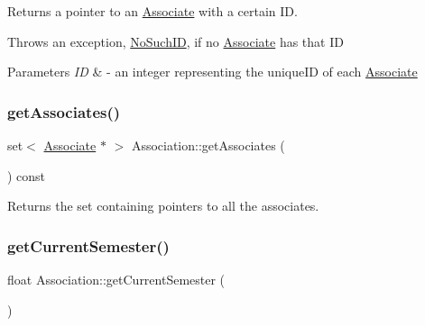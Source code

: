 Returns a pointer to an \mbox{\hyperlink{classAssociate}{Associate}} with a certain ID. 

Throws an exception, \mbox{\hyperlink{classNoSuchID}{No\+Such\+ID}}, if no \mbox{\hyperlink{classAssociate}{Associate}} has that ID


\begin{DoxyParams}{Parameters}
{\em ID} & -\/ an integer representing the unique\+ID of each \mbox{\hyperlink{classAssociate}{Associate}} \\
\hline
\end{DoxyParams}
\mbox{\label{classAssociation_a7ef9441d3b0a176012f393453344fdf1}} 
\subsubsection{\texorpdfstring{get\+Associates()}{getAssociates()}}
{\footnotesize\ttfamily set$<$ \mbox{\hyperlink{classAssociate}{Associate}} $\ast$ $>$ Association\+::get\+Associates (\begin{DoxyParamCaption}{ }\end{DoxyParamCaption}) const}



Returns the set containing pointers to all the associates. 

\mbox{\label{classAssociation_a6d31c13ec77d54a1e814ae9528af694a}} 
\subsubsection{\texorpdfstring{get\+Current\+Semester()}{getCurrentSemester()}}
{\footnotesize\ttfamily float Association\+::get\+Current\+Semester (\begin{DoxyParamCaption}{ }\end{DoxyParamCaption})\hspace{0.3cm}{\ttfamily [static]}}

\mbox{\label{classAssociation_a92f8779f17716e9dcd206f63f888403c}} 
